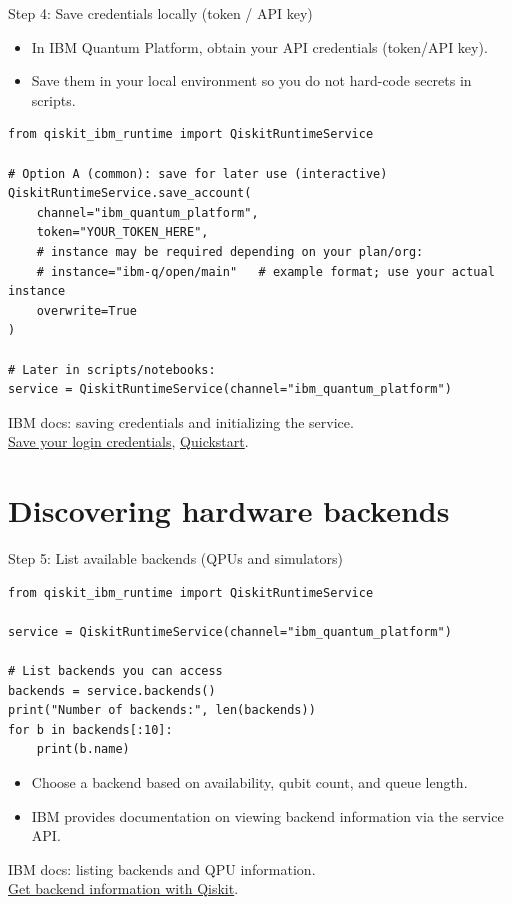 \documentclass{beamer}
\begin{document}
\begin{frame}[fragile]{Step 4: Save credentials locally (token / API key)}
\begin{itemize}
  \item In IBM Quantum Platform, obtain your API credentials (token/API key).
  \item Save them in your local environment so you do not hard-code secrets in scripts.
\end{itemize}

\begin{lstlisting}
from qiskit_ibm_runtime import QiskitRuntimeService

# Option A (common): save for later use (interactive)
QiskitRuntimeService.save_account(
    channel="ibm_quantum_platform",
    token="YOUR_TOKEN_HERE",
    # instance may be required depending on your plan/org:
    # instance="ibm-q/open/main"   # example format; use your actual instance
    overwrite=True
)

# Later in scripts/notebooks:
service = QiskitRuntimeService(channel="ibm_quantum_platform")
\end{lstlisting}

\vspace{0.4em}
\scriptsize
IBM docs: saving credentials and initializing the service.\\
\href{https://quantum.cloud.ibm.com/docs/guides/save-credentials}{Save your login credentials},
\href{https://quantum.cloud.ibm.com/docs/guides/quick-start}{Quickstart}.%
\end{frame}

\section{Discovering hardware backends}

\begin{frame}[fragile]{Step 5: List available backends (QPUs and simulators)}
\begin{lstlisting}
from qiskit_ibm_runtime import QiskitRuntimeService

service = QiskitRuntimeService(channel="ibm_quantum_platform")

# List backends you can access
backends = service.backends()
print("Number of backends:", len(backends))
for b in backends[:10]:
    print(b.name)
\end{lstlisting}

\begin{itemize}
  \item Choose a backend based on availability, qubit count, and queue length.
  \item IBM provides documentation on viewing backend information via the service API.
\end{itemize}

\vspace{0.4em}
\scriptsize
IBM docs: listing backends and QPU information.\\
\href{https://quantum.cloud.ibm.com/docs/guides/get-qpu-information}{Get backend information with Qiskit}.%
\end{frame}
\end{document}

